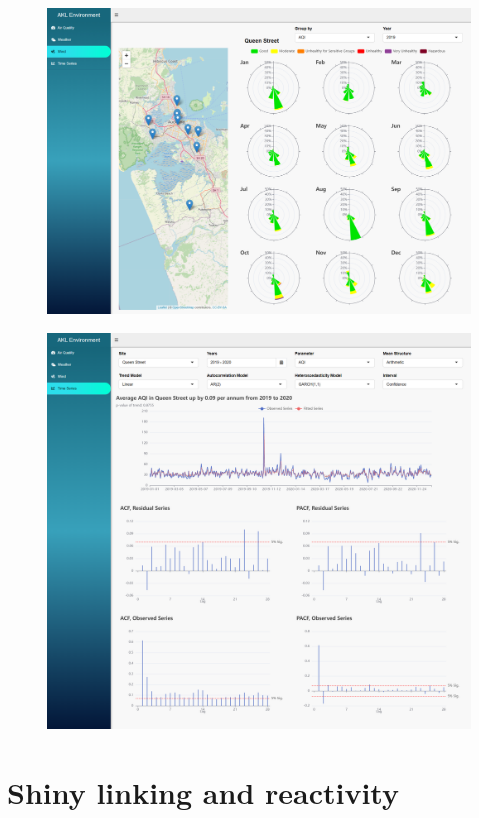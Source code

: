 \documentclass{aucklandthesis}
\begin{document}
\begin{figure}
\includegraphics[width=1\linewidth]{figures/wind-tab} \end{figure}
\begin{figure}
\includegraphics[width=1\linewidth]{figures/ts-tab} \end{figure}

\hypertarget{ch:linking}{%
\chapter{Shiny linking and reactivity}\label{ch:linking}}
\end{document}
